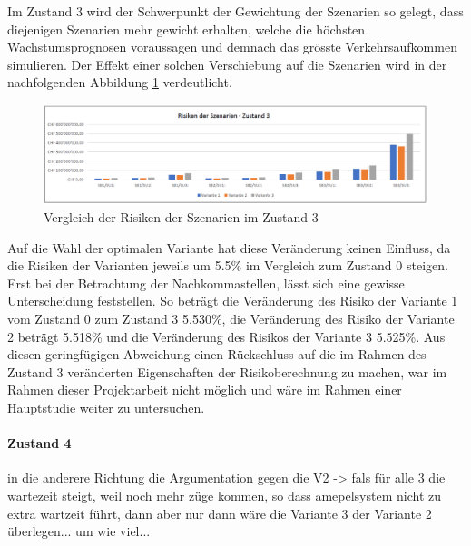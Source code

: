 Im Zustand 3 wird der Schwerpunkt der Gewichtung der Szenarien so gelegt, dass diejenigen Szenarien mehr gewicht erhalten, welche die höchsten Wachstumsprognosen voraussagen und demnach das grösste Verkehrsaufkommen simulieren. Der Effekt einer solchen Verschiebung auf die Szenarien wird in der nachfolgenden Abbildung \ref{img:SzeVer-Z3} verdeutlicht. 

\begin{figure}[h!]
	\centering
	\includegraphics[width=.45\textwidth]{figures/f-06-05-RisikenSzenarienZ3}
	\caption[Szenarienvergleich im Zustand 3]{Vergleich der Risiken der Szenarien im Zustand 3}
	\label{img:SzeVer-Z3}
\end{figure} 

Auf die Wahl der optimalen Variante hat diese Veränderung keinen Einfluss, da die Risiken der Varianten jeweils um 5.5\% im Vergleich zum Zustand 0 steigen. Erst bei der Betrachtung der Nachkommastellen, lässt sich eine gewisse Unterscheidung feststellen. So beträgt die Veränderung des Risiko der Variante 1 vom Zustand 0 zum Zustand 3 5.530\%, die Veränderung des Risiko der Variante 2 beträgt 5.518\% und die Veränderung des Risikos der Variante 3 5.525\%. Aus diesen geringfügigen Abweichung einen Rückschluss auf die im Rahmen des Zustand 3 veränderten Eigenschaften der Risikoberechnung zu machen, war im Rahmen dieser Projektarbeit nicht möglich und wäre im Rahmen einer Hauptstudie weiter zu untersuchen.


\paragraph{Zustand 4} 

in die anderere Richtung die Argumentation gegen die V2 -> fals für alle 3 die wartezeit steigt, weil noch mehr züge kommen, so dass amepelsystem nicht zu extra wartzeit führt, dann aber nur dann wäre die Variante 3 der Variante 2 überlegen... um wie viel...



